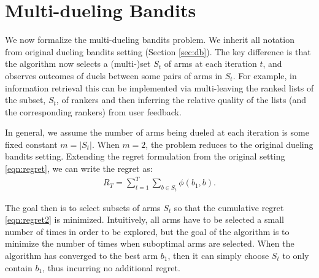 

\section{Multi-dueling Bandits}
\label{sec:problem}

We now formalize the multi-dueling bandits problem. We inherit all notation from original dueling bandits setting (Section \ref{sec:db}).
The key difference is that the algorithm now selects a (multi-)set $S_t$ of arms at each iteration $t$, and observes outcomes of duels between some pairs of arms in $S_t$. For example, in information retrieval this can be implemented via multi-leaving \citep{schuth2014multileaved} the ranked lists of the subset, $S_t$, of rankers and then inferring the relative quality of the lists (and the corresponding rankers) from user feedback. 

In general, we assume the number of arms being dueled at each iteration is some fixed constant $m = |S_t|$.  When $m=2$, the problem reduces to the original dueling bandits setting. Extending the regret formulation from the original setting \eqref{eqn:regret}, we can write the regret as:
\begin{eqnarray}
R_T = \sum_{t=1}^T \sum_{b\in S_t} \phi(b_1,b).\label{eqn:regret2}
\end{eqnarray}


The goal then is to select subsets of arms ${S_t}$ so that the cumulative regret \eqref{eqn:regret2} is minimized. Intuitively, all arms have to be selected a small number of times in order to be explored, but the goal of the algorithm is to minimize the number of times when suboptimal arms are selected.
When the algorithm has converged to the best arm $b_1$, then it can simply choose $S_t$ to only contain $b_1$, thus incurring no additional regret.

